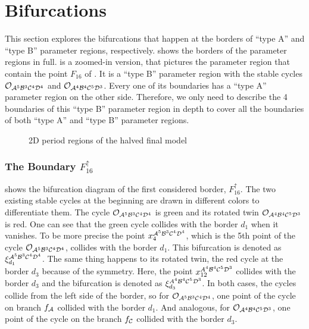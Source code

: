 \section{Bifurcations}
\label{sec:dynarch.bif}
\label{sec:minrep.bif}

This section explores the bifurcations that happen at the borders of ``type A'' and ``type B'' parameter regions, respectively.
 shows the borders of the parameter regions in full.
 is a zoomed-in version, that pictures the parameter region that contain the point $F_{16}$ of .
It is a ``type B'' parameter region with the stable cycles $\mathcal{O}_{\mathcal{A}^5\mathcal{B}^3\mathcal{C}^4\mathcal{D}^4}$ and $\mathcal{O}_{\mathcal{A}^4\mathcal{B}^4\mathcal{C}^5\mathcal{D}^3}$.
Every one of its boundaries has a ``type A'' parameter region on the other side.
Therefore, we only need to describe the 4 boundaries of this ``type B'' parameter region in depth to cover all the boundaries of both ``type A'' and ``type B'' parameter regions.

\begin{figure}
	\centering
	\caption{2D period regions of the halved final model}
	\label{fig:archdyn.dyn.regions}
\end{figure}

\subsubsection{The Boundary $F_{16}^\uparrow$}
\label{sec:minrep.bif.U}

 shows the bifurcation diagram of the first considered border, $F_{16}^\uparrow$.
The two existing stable cycles at the beginning are drawn in different colors to differentiate them.
The cycle $\mathcal{O}_{\mathcal{A}^5\mathcal{B}^3\mathcal{C}^4\mathcal{D}^4}$ is green and its rotated twin $\mathcal{O}_{\mathcal{A}^4\mathcal{B}^4\mathcal{C}^5\mathcal{D}^3}$ is red.
One can see that the green cycle collides with the border $d_1$ when it vanishes.
To be more precise the point $x_4^{\mathcal{A}^5\mathcal{B}^3\mathcal{C}^4\mathcal{D}^4}$, which is the 5th point of the cycle $\mathcal{O}_{\mathcal{A}^5\mathcal{B}^3\mathcal{C}^4\mathcal{D}^4}$, collides with the border $d_1$.
This bifurcation is denoted as $\xi_{d_1}^{\mathcal{A}^5\mathcal{B}^3\mathcal{C}^4\mathcal{D}^4}$.
The same thing happens to its rotated twin, the red cycle at the border $d_3$ because of the symmetry.
Here, the point $x_{12}^{A^4\mathcal{B}^4\mathcal{C}^5\mathcal{D}^3}$ collides with the border $d_3$ and the bifurcation is denoted as $\xi_{d_3}^{A^4\mathcal{B}^4\mathcal{C}^5\mathcal{D}^3}$.
In both cases, the cycles collide from the left side of the border, so for $\mathcal{O}_{\mathcal{A}^5\mathcal{B}^3\mathcal{C}^4\mathcal{D}^4}$, one point of the cycle on branch $f_{\mathcal{A}}$ collided with the border $d_1$.
And analogous, for $\mathcal{O}_{\mathcal{A}^4\mathcal{B}^4\mathcal{C}^5\mathcal{D}^3}$, one point of the cycle on the branch $f_{\mathcal{C}}$ collided with the border $d_3$.

